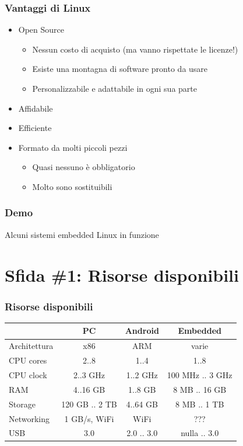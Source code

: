 \documentclass[xetex,table]{beamer}
\begin{document}
\begin{frame}
\frametitle{Vantaggi di Linux}
  \begin{itemize}
    \item Open Source
    \begin{itemize}
      \item Nessun costo di acquisto (ma vanno rispettate le licenze!)
      \item Esiste una montagna di software pronto da usare
      \item Personalizzabile e adattabile in ogni sua parte
    \end{itemize}
    \item Affidabile
    \item Efficiente
    \item Formato da molti piccoli pezzi
    \begin{itemize}
      \item Quasi nessuno è obbligatorio
      \item Molto sono sostituibili
    \end{itemize}
  \end{itemize}
\end{frame}

\begin{frame}
\frametitle[Demo! Alcuni sistemi Linux embedded in funzione]{Demo}
  \begin{center}
    \LARGE
    Alcuni sistemi embedded Linux in funzione
  \end{center}
\end{frame}

\section{Sfida \#1: Risorse disponibili}

\begin{frame}
\frametitle{Risorse disponibili}
{
  \begin{tabular}{ |l|c|c|c|  }
    \hline
     & PC & Android & Embedded \\
    \hline
    Architettura & x86            & ARM        & varie            \\
    CPU cores    & 2..8           & 1..4       & 1..8             \\
    CPU clock    & 2..3 GHz       & 1..2 GHz   & 100 MHz .. 3 GHz \\
    RAM          & 4..16 GB       & 1..8 GB    & 8 MB .. 16 GB    \\
    Storage      & 120 GB .. 2 TB & 4..64 GB   & 8 MB .. 1 TB     \\
    Networking   & 1 GB/s, WiFi   & WiFi       & ???              \\
    USB          & 3.0            & 2.0 .. 3.0 & nulla .. 3.0     \\
    \hline
  \end{tabular}
}
\end{frame}
\end{document}
